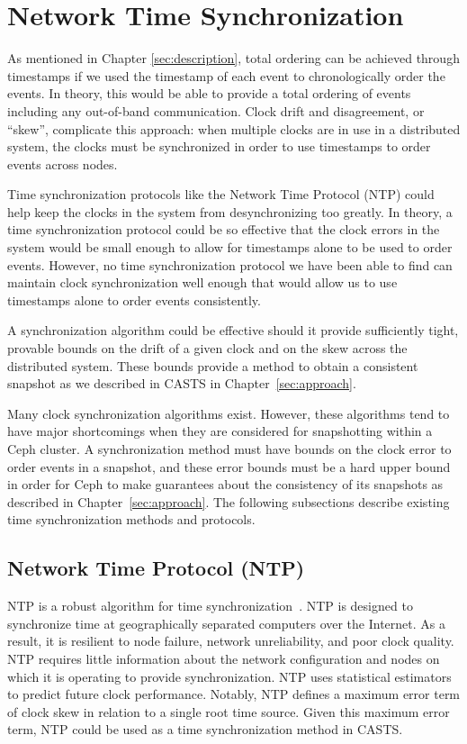 \section{Network Time Synchronization}

As mentioned in Chapter \ref{sec:description}, total ordering can be
achieved through timestamps if we used the timestamp of each event
to chronologically order the events. 
In theory, this would be able to provide
a total ordering of events including any out-of-band
communication. Clock drift and disagreement, or ``skew'', complicate this approach: when
multiple clocks are in use in a distributed system, the clocks must be
synchronized in order to use timestamps to order events across nodes.

Time synchronization protocols like the Network Time Protocol (NTP)
could help keep the clocks in the system from desynchronizing too
greatly. In theory, a time synchronization protocol could be so effective that 
the clock errors in the system would be small enough to allow for timestamps 
alone to be used to order events. However, no time synchronization protocol 
we have been able to
find can maintain clock synchronization well enough that would allow
us to use timestamps alone to order events consistently. 

A synchronization algorithm could be effective should it provide
sufficiently tight, provable bounds on the drift of a given clock and
on the skew across the distributed system. These bounds provide a
method to obtain a consistent snapshot as we described in CASTS
in Chapter~\ref{sec:approach}.

Many clock synchronization algorithms exist. However, these
algorithms tend to have major shortcomings when they are considered
for snapshotting within a Ceph cluster. A
synchronization method must have bounds on the clock error to order
events in a snapshot, and these error bounds must be a hard upper
bound in order for Ceph to make guarantees about the consistency of
its snapshots as described in Chapter~\ref{sec:approach}. The following subsections describe existing time
synchronization methods and protocols.

\subsection{Network Time Protocol (NTP)}

NTP is a robust algorithm for time
synchronization~\citep{Burbank2010}. NTP is designed to synchronize
time at geographically separated computers over the Internet. As a
result, it is resilient to node failure, network unreliability, and
poor clock quality. NTP requires little information about the
network configuration and nodes on which it is operating to provide 
synchronization. NTP uses statistical estimators to predict
future clock performance. Notably, NTP defines a maximum error
term of clock skew in relation to a single root time source. Given this maximum
error term, NTP could be used as a time synchronization method
in CASTS.

